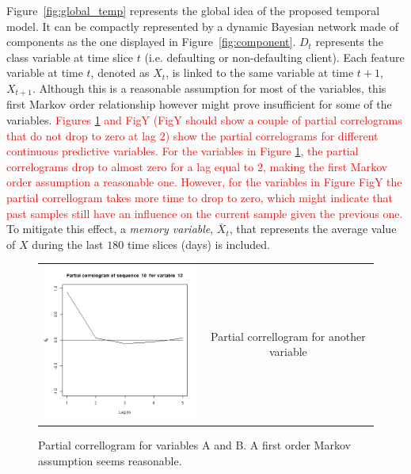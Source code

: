 Figure~\ref{fig:global_temp} represents the global idea of the proposed temporal model. It can be compactly represented by a dynamic Bayesian network made of components as the one displayed in 
Figure~\ref{fig:component}. $D_t$ represents the class variable at time slice $t$ (i.e. defaulting or non-defaulting client). Each feature variable at time $t$, denoted as $X_t$, is linked to the same variable at time $t+1$, $X_{t+1}$. Although this is a reasonable assumption for most of the variables, this first Markov order relationship however might prove insufficient for some of the variables. \textcolor{red}{Figures \ref{fig:cajamarPC1order} and FigY (FigY should show a couple of partial correlograms that do not drop to zero at lag $2$)  show the partial correlograms for different continuous predictive variables. For the variables in Figure \ref{fig:cajamarPC1order}, the partial correlograms drop to almost zero for a lag equal to $2$, making the first Markov order assumption a reasonable one. However, for the variables in Figure FigY the partial correllogram takes more time to drop to zero, which might indicate that past samples still have an influence on the current sample given the previous one.} To mitigate this effect,  a \emph{memory variable}, $\bar{X}_t$, that represents the average value of $X$ during the last $180$ time slices (days) is included. 


\begin{figure}
  \centering
    \begin{tabular}{cc}
    \includegraphics[width=70mm]{figures/CajaMarpcrl13}&
    \begin{minipage}[b]{0.45\linewidth} Partial correllogram for another variable\end{minipage}\\
  \end{tabular}
    \caption{\label{fig:cajamarPC1order}Partial correllogram for variables A and B. A first order Markov assumption seems reasonable.}
\end{figure}



